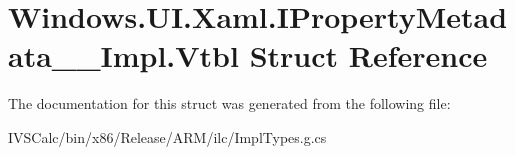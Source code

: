 \hypertarget{struct_windows_1_1_u_i_1_1_xaml_1_1_i_property_metadata_____impl_1_1_vtbl}{}\section{Windows.\+U\+I.\+Xaml.\+I\+Property\+Metadata\+\_\+\+\_\+\+Impl.\+Vtbl Struct Reference}
\label{struct_windows_1_1_u_i_1_1_xaml_1_1_i_property_metadata_____impl_1_1_vtbl}


The documentation for this struct was generated from the following file\+:\begin{DoxyCompactItemize}
\item 
I\+V\+S\+Calc/bin/x86/\+Release/\+A\+R\+M/ilc/Impl\+Types.\+g.\+cs\end{DoxyCompactItemize}
